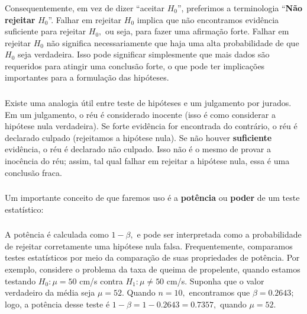 \documentclass[14pt,aspectratio=1610]{beamer}
\newcommand{\Ho}{\ensuremath{H_{0}}}
\newcommand{\Hi}{\ensuremath{H_{1}}}
\begin{document}
\begin{frame}{}
\frametitle{}
\begin{block}{}
\justifying
Consequentemente, em vez de dizer ``aceitar $\Ho$'', preferimos a terminologia ``\textbf{Não rejeitar }$\Ho$''. Falhar em rejeitar $\Ho$ implica que não encontramos evidência 
suficiente para rejeitar $\Ho,$ ou seja, para fazer uma afirmação forte. Falhar em rejeitar $\Ho$ não significa necessariamente que haja uma alta probabilidade de que 
$\Ho$ seja verdadeira. Isso pode significar simplesmente que mais dados são requeridos para atingir uma conclusão forte, o que pode ter implicações importantes para 
a formulação das hipóteses.
\end{block}
\end{frame}

\begin{frame}{}
\frametitle{}
\begin{block}{}
\justifying
Existe uma analogia útil entre teste de hipóteses e um julgamento por jurados. Em um julgamento, o réu é considerado inocente (isso é como considerar a hipótese 
nula verdadeira). Se forte evidência for encontrada do contrário, o réu é declarado culpado (rejeitamos a hipótese nula). Se não houver \textbf{suficiente} evidência, o réu é 
declarado não culpado. Isso não é o mesmo de provar a inocência do réu; assim, tal qual falhar em rejeitar a hipótese nula, essa é uma conclusão fraca.
\end{block}
\end{frame}

\begin{frame}{}
\frametitle{}
\begin{block}{}
\justifying
Um importante conceito de que faremos uso é a \textbf{potência} ou \textbf{poder} de um teste estatístico:
\end{block}
\end{frame}

\begin{frame}{}
\frametitle{}
\begin{block}{}
\justifying
A potência é calculada como $1-\beta,$ e pode ser interpretada como a probabilidade de rejeitar corretamente uma hipótese nula falsa. Frequentemente, 
comparamos testes estatísticos por meio da comparação de suas propriedades de potência. Por exemplo, considere o problema da taxa de queima de propelente, quando 
estamos testando $\Ho: \mu = 50$ cm/s contra $\Hi: \mu \neq 50$ cm/s. Suponha que o valor verdadeiro da média seja $\mu = 52.$ Quando $n = 10,$ encontramos 
que $\beta = 0.2643;$ logo, a potência desse teste é $1-\beta = 1 - 0.2643 = 0.7357,$ quando $\mu = 52.$
\end{block}
\end{frame}
\end{document}
